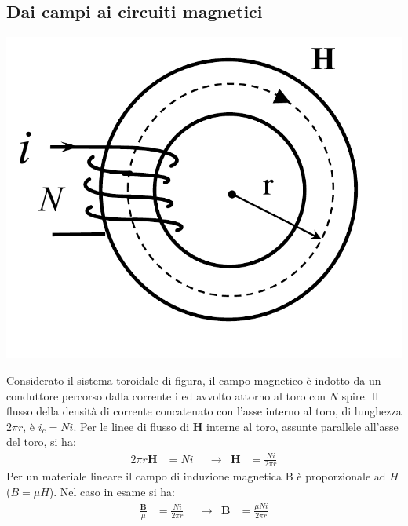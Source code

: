 \documentclass{article}
\begin{document}
\subsection{Dai campi ai circuiti magnetici}
\begin{center}
    \includegraphics[scale=0.27]{Image/Circuiti_magnetici_1.png}
\end{center}
Considerato il sistema toroidale di figura,
il campo magnetico è indotto da un conduttore percorso dalla corrente i ed avvolto attorno al toro con $N$ spire. Il flusso della densità di corrente concatenato con l'asse interno al toro, di lunghezza $2 \pi r$, è $i_c = Ni$. Per le linee di flusso di $\mathbf{H}$ interne al toro, assunte parallele all'asse del toro, si ha:
\begin{align*}
    2 \pi r \mathbf{H} &= Ni & &\rightarrow & \mathbf{H} &= \frac{N i}{2 \pi r}
\end{align*}
Per un materiale lineare il campo di induzione magnetica B è proporzionale
ad $H$ ($B = \mu H$). Nel caso in esame si ha:
\begin{align*}
    \frac{\mathbf{B}}{\mu} &= \frac{N i}{2 \pi r} & &\rightarrow & \mathbf{B} &= \frac{\mu N i}{2 \pi r}
\end{align*}
\end{document}

